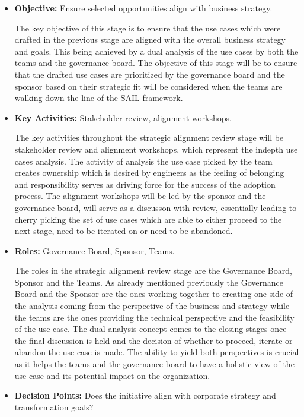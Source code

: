 \documentclass[]{imc-inf}
\begin{document}
\begin{itemize}
	\item
	\textbf{Objective:} Ensure selected opportunities align with business
	strategy.
	
	The key objective of this stage is to ensure that the use cases which
	were drafted in the previous stage are aligned with the overall
	business strategy and goals. This being achieved by a dual analysis of
	the use cases by both the teams and the governance board. The
	objective of this stage will be to ensure that the drafted use cases
	are prioritized by the governance board and the sponsor based on their
	strategic fit will be considered when the teams are walking down the
	line of the SAIL framework.
	\item
	\textbf{Key Activities:} Stakeholder review, alignment workshops.
	
	The key activities throughout the strategic alignment review stage
	will be stakeholder review and alignment workshops, which represent
	the indepth use cases analysis. The activity of analysis the use case
	picked by the team creates ownership which is desired by engineers as
	the feeling of belonging and responsibility serves as driving force
	for the success of the adoption process. The alignment workshops will
	be led by the sponsor and the governance board, will serve as a
	discusson with review, essentially leading to cherry picking the set
	of use cases which are able to either proceed to the next stage, need
	to be iterated on or need to be abandoned.
	\item
	\textbf{Roles:} Governance Board, Sponsor, Teams.
	
	The roles in the strategic alignment review stage are the Governance
	Board, Sponsor and the Teams. As already mentioned previously the
	Governance Board and the Sponsor are the ones working together to
	creating one side of the analysis coming from the perspective of the
	business and strategy while the teams are the ones providing the
	technical perspective and the feasibility of the use case. The dual
	analysis concept comes to the closing stages once the final discussion
	is held and the decision of whether to proceed, iterate or abandon the
	use case is made. The ability to yield both perspectives is crucial as
	it helps the teams and the governance board to have a holistic view of
	the use case and its potential impact on the organization.
	\item
	\textbf{Decision Points:} Does the initiative align with corporate
	strategy and transformation goals?
	

\end{itemize}
\end{document}
